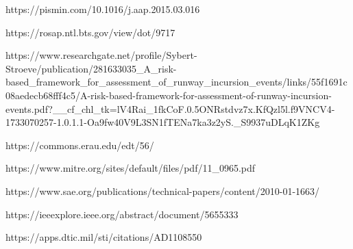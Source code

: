 https://pismin.com/10.1016/j.aap.2015.03.016

https://rosap.ntl.bts.gov/view/dot/9717

https://www.researchgate.net/profile/Sybert-Stroeve/publication/281633035_A_risk-based_framework_for_assessment_of_runway_incursion_events/links/55f1691c08aedecb68fff4c5/A-risk-based-framework-for-assessment-of-runway-incursion-events.pdf?__cf_chl_tk=lV4Rai_1fkCoF.0.5ONRstdvz7x.KfQzl5l.f9VNCV4-1733070257-1.0.1.1-Oa9fw40V9L3SN1fTENa7ka3z2yS._S9937uDLqK1ZKg

https://commons.erau.edu/edt/56/

https://www.mitre.org/sites/default/files/pdf/11_0965.pdf

https://www.sae.org/publications/technical-papers/content/2010-01-1663/

https://ieeexplore.ieee.org/abstract/document/5655333

https://apps.dtic.mil/sti/citations/AD1108550

